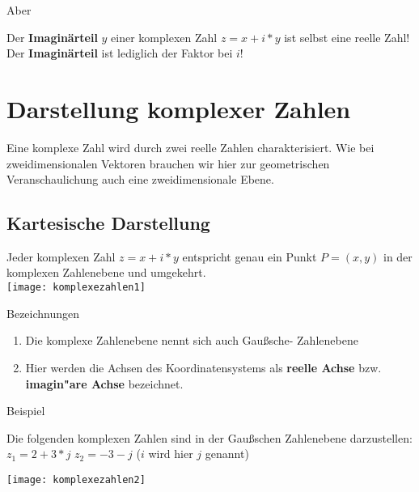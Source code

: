 \begin{Bemerkung}
Aber\\
\end{Bemerkung}

Der  \textbf{Imaginärteil} $y$ einer komplexen Zahl  $z =x+i*y$ ist selbst eine reelle Zahl! Der \textbf{Imaginärteil} ist lediglich der Faktor bei $i$!\\

	\section{Darstellung komplexer Zahlen}

Eine komplexe Zahl wird durch zwei reelle Zahlen charakterisiert. Wie bei zweidimensionalen Vektoren brauchen wir hier zur geometrischen Veranschaulichung auch eine zweidimensionale Ebene.\\

	\subsection{Kartesische Darstellung}

Jeder komplexen Zahl $z =x+i*y$ entspricht genau ein Punkt $P =(x,y)$ in der komplexen Zahlenebene und umgekehrt.\\

\texttt{[image: komplexezahlen1]}

\begin{Bemerkung}
Bezeichnungen\\
\end{Bemerkung}

\begin{enumerate}
\item Die komplexe Zahlenebene nennt sich auch Gaußsche- Zahlenebene
\item Hier werden die Achsen des Koordinatensystems als \textbf{reelle Achse} bzw. \textbf{imagin"are Achse} bezeichnet.\\
\end{enumerate}

\begin{Bemerkung}
Beispiel\\
\end{Bemerkung}

Die folgenden komplexen Zahlen sind in der Gaußschen Zahlenebene darzustellen: \\
$z_{1} = 2+3*j$  $z_{2} =-3-j$ ($i$ wird hier $j$ genannt)

\texttt{[image: komplexezahlen2]}

